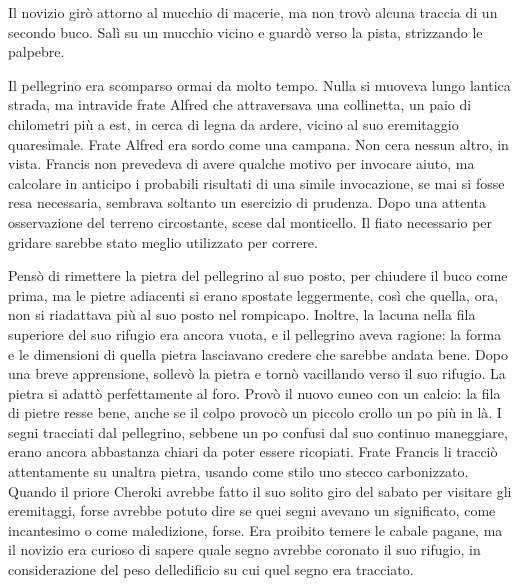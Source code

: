 Il novizio girò attorno al mucchio di macerie, ma non trovò alcuna
traccia di un secondo buco. Salì su un mucchio vicino e guardò verso la
pista, strizzando le palpebre.

Il pellegrino era scomparso ormai da molto tempo. Nulla si muoveva lungo
l\textquotesingle antica strada, ma intravide frate Alfred che
attraversava una collinetta, un paio di chilometri più a est, in cerca
di legna da ardere, vicino al suo eremitaggio quaresimale. Frate Alfred
era sordo come una campana. Non c\textquotesingle era nessun altro, in
vista. Francis non prevedeva di avere qualche motivo per invocare aiuto,
ma calcolare in anticipo i probabili risultati di una simile
invocazione, se mai si fosse resa necessaria, sembrava soltanto un
esercizio di prudenza. Dopo una attenta osservazione del terreno
circostante, scese dal monticello. Il fiato necessario per gridare
sarebbe stato meglio utilizzato per correre.

Pensò di rimettere la pietra del pellegrino al suo posto, per chiudere
il buco come prima, ma le pietre adiacenti si erano spostate
leggermente, così che quella, ora, non si riadattava più al suo posto
nel rompicapo. Inoltre, la lacuna nella fila superiore del suo rifugio
era ancora vuota, e il pellegrino aveva ragione: la forma e le
dimensioni di quella pietra lasciavano credere che sarebbe andata bene.
Dopo una breve apprensione, sollevò la pietra e tornò vacillando verso
il suo rifugio. La pietra si adattò perfettamente al foro. Provò il
nuovo cuneo con un calcio: la fila di pietre resse bene, anche se il
colpo provocò un piccolo crollo un po\textquotesingle{} più in là. I
segni tracciati dal pellegrino, sebbene un po\textquotesingle{} confusi
dal suo continuo maneggiare, erano ancora abbastanza chiari da poter
essere ricopiati. Frate Francis li tracciò attentamente su
un\textquotesingle altra pietra, usando come stilo uno stecco
carbonizzato. Quando il priore Cheroki avrebbe fatto il suo solito giro
del sabato per visitare gli eremitaggi, forse avrebbe potuto dire se
quei segni avevano un significato, come incantesimo o come maledizione,
forse. Era proibito temere le cabale pagane, ma il novizio era curioso
di sapere quale segno avrebbe coronato il suo rifugio, in considerazione
del peso dell\textquotesingle edificio su cui quel segno era tracciato.

